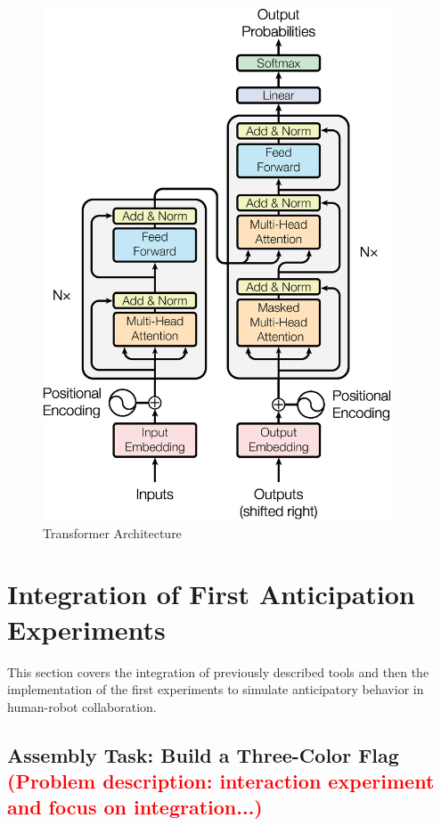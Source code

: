 \begin{figure}[!ht]
\centerline{\includegraphics[height=6in]{figs/transformer.jpg}}
\caption[Transformer Architecture]{Transformer Architecture \cite{Vaswani2017}}
\label{fig:transformer_arch}
\end{figure}

\section{Integration of First Anticipation Experiments}
\label{section:first_experiments}

This section covers the integration of previously described tools and then the implementation of the first experiments to simulate anticipatory behavior in human-robot collaboration.


\subsection{Assembly Task: Build a Three-Color Flag \textcolor{red}{(Problem description: interaction experiment and focus on integration...)}}

